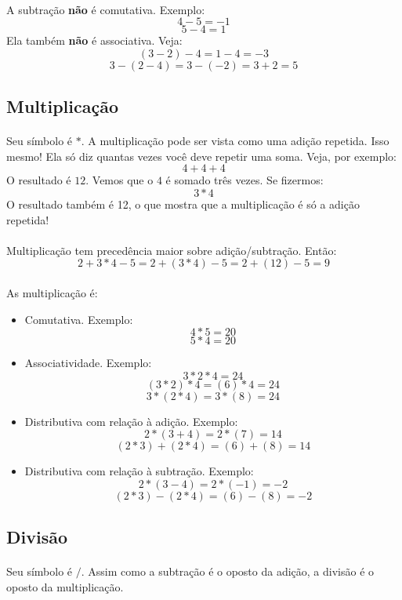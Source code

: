 \documentclass{article}
\begin{document}
\paragraph{}
A subtração \textbf{não} é comutativa. Exemplo:
$$4 - 5 = -1$$
$$5 - 4 = 1$$
Ela também \textbf{não} é associativa. Veja:
$$(3 - 2) - 4 = 1 - 4 = -3$$
$$3 - (2 - 4) = 3 - (-2) = 3 + 2 = 5$$

\subsection{Multiplicação}
\paragraph{}
Seu símbolo é $*$.
A multiplicação pode ser vista como uma adição repetida. Isso mesmo! Ela só
diz quantas vezes você deve repetir uma soma. Veja, por exemplo:
$$4 + 4 + 4$$
O resultado é $12$. Vemos que o $4$ é somado três vezes. Se fizermos:
$$3*4$$
O resultado também é 12, o que mostra que a multiplicação é só a adição 
repetida!
\paragraph{}
Multiplicação tem precedência maior sobre adição/subtração. Então:
$$2 + 3*4 - 5 = 2 + (3*4) - 5 = 2 + (12) - 5 = 9$$
\paragraph{}
As multiplicação é:
\begin{itemize}
\item Comutativa. Exemplo:
$$4*5 = 20$$
$$5*4 = 20$$
\item Associatividade. Exemplo:
$$3*2*4 = 24$$
$$(3*2)*4 = (6)*4 = 24$$
$$3*(2*4) = 3*(8) = 24$$
\item Distributiva com relação à adição. Exemplo:
$$2*(3 + 4) = 2*(7) = 14$$
$$(2*3) + (2*4) = (6) + (8) = 14$$
\item Distributiva com relação à subtração. Exemplo:
$$2*(3 - 4) = 2*(-1) = -2$$
$$(2*3) - (2*4) = (6) - (8) = -2$$
\end{itemize}

\subsection{Divisão}
\paragraph{}
Seu símbolo é $/$.
Assim como a subtração é o oposto da adição, a divisão é o oposto da 
multiplicação.
\end{document}
